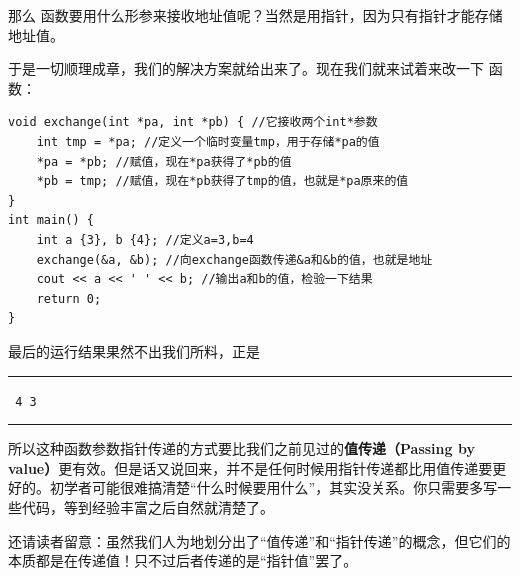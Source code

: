 那么 \lstinline@exchange@ 函数要用什么形参来接收地址值呢？当然是用指针，因为只有指针才能存储地址值。\par
于是一切顺理成章，我们的解决方案就给出来了。现在我们就来试着来改一下 \lstinline@exchange@ 函数：
\begin{lstlisting}
void exchange(int *pa, int *pb) { //它接收两个int*参数
    int tmp = *pa; //定义一个临时变量tmp，用于存储*pa的值
    *pa = *pb; //赋值，现在*pa获得了*pb的值
    *pb = tmp; //赋值，现在*pb获得了tmp的值，也就是*pa原来的值
}
int main() {
    int a {3}, b {4}; //定义a=3,b=4
    exchange(&a, &b); //向exchange函数传递&a和&b的值，也就是地址
    cout << a << ' ' << b; //输出a和b的值，检验一下结果
    return 0;
}
\end{lstlisting}
最后的运行结果果然不出我们所料，正是\\\noindent\rule{\linewidth}{0.2pt}\texttt{
4 3
}\\\noindent\rule{\linewidth}{0.2pt}
所以这种函数参数指针传递的方式要比我们之前见过的\textbf{值传递（Passing by value）}更有效。但是话又说回来，并不是任何时候用指针传递都比用值传递要更好的。初学者可能很难搞清楚``什么时候要用什么''，其实没关系。你只需要多写一些代码，等到经验丰富之后自然就清楚了。\par
还请读者留意：虽然我们人为地划分出了``值传递''和``指针传递''的概念，但它们的本质都是在传递值！只不过后者传递的是``指针值''罢了。\par
